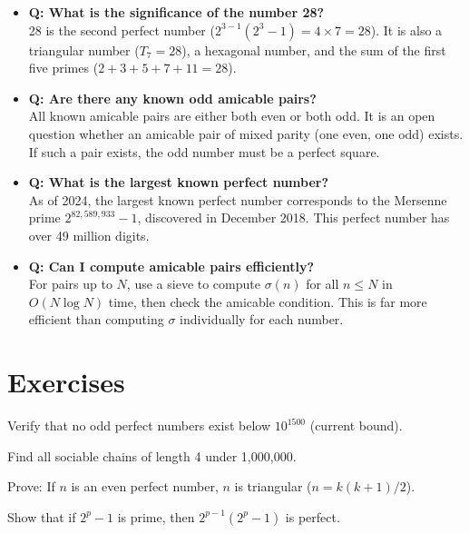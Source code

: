 \begin{itemize}
\item \textbf{Q: What is the significance of the number 28?} \\
28 is the second perfect number ($2^{3-1}(2^3 - 1) = 4 \times 7 = 28$). It is also a triangular number ($T_7 = 28$), a hexagonal number, and the sum of the first five primes ($2+3+5+7+11 = 28$).

\item \textbf{Q: Are there any known odd amicable pairs?} \\
All known amicable pairs are either both even or both odd. It is an open question whether an amicable pair of mixed parity (one even, one odd) exists. If such a pair exists, the odd number must be a perfect square.

\item \textbf{Q: What is the largest known perfect number?} \\
As of 2024, the largest known perfect number corresponds to the Mersenne prime $2^{82,589,933} - 1$, discovered in December 2018. This perfect number has over 49 million digits.

\item \textbf{Q: Can I compute amicable pairs efficiently?} \\
For pairs up to $N$, use a sieve to compute $\sigma(n)$ for all $n \leq N$ in $O(N \log N)$ time, then check the amicable condition. This is far more efficient than computing $\sigma$ individually for each number.
\end{itemize}

\section{Exercises}

\begin{exercise}
Verify that no odd perfect numbers exist below $10^{1500}$ (current bound).
\end{exercise}

\begin{exercise}
Find all sociable chains of length 4 under 1,000,000.
\end{exercise}

\begin{exercise}
Prove: If $n$ is an even perfect number, $n$ is triangular ($n = k(k+1)/2$).
\end{exercise}

\begin{exercise}
Show that if $2^p - 1$ is prime, then $2^{p-1}(2^p - 1)$ is perfect.
\end{exercise}

